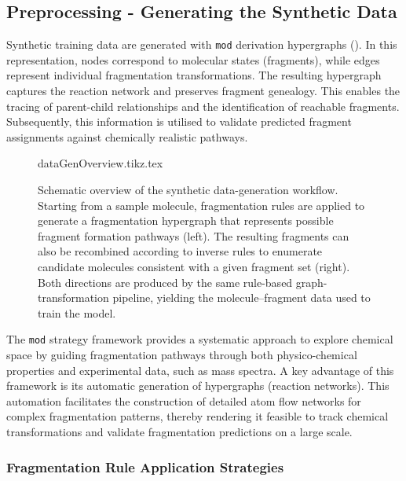 \subsection{Preprocessing - Generating the Synthetic Data}

Synthetic training data are generated with \texttt{mod} derivation hypergraphs ().
In this representation, nodes correspond to molecular states (fragments), while edges represent individual fragmentation transformations.
The resulting hypergraph captures the reaction network and preserves fragment genealogy.
This enables the tracing of parent-child relationships and the identification of reachable fragments.
Subsequently, this information is utilised to validate predicted fragment assignments against chemically realistic pathways.

\begin{figure}
    \centering
    {dataGenOverview.tikz.tex}
    \caption[Schematic of the synthetic data-generation workflow]{
        Schematic overview of the synthetic data-generation workflow.
        Starting from a sample molecule, fragmentation rules are applied to generate a fragmentation hypergraph
        that represents possible fragment formation pathways (left).
        The resulting fragments can also be recombined according to inverse rules to enumerate
        candidate molecules consistent with a given fragment set (right).
        Both directions are produced by the same rule-based graph-transformation pipeline,
        yielding the molecule--fragment data used to train the model.
    }
    \label{fig:data-gen-overview}
\end{figure}

The \texttt{mod} strategy framework provides a systematic approach to explore chemical space by guiding fragmentation pathways through both physico-chemical properties and experimental data, such as mass spectra.
A key advantage of this framework is its automatic generation of hypergraphs (reaction networks).
This automation facilitates the construction of detailed atom flow networks for complex fragmentation patterns, thereby rendering it feasible to track chemical transformations and validate fragmentation predictions on a large scale.
\cite[p.~7]{Andersen2017}

\subsubsection{Fragmentation Rule Application Strategies}

